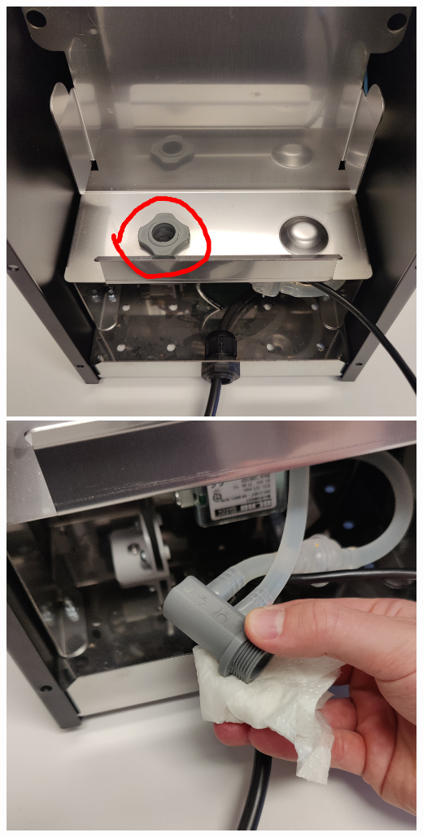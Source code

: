 \documentclass[]{article}
\begin{document}
\begin{minipage}[t]{0.4\linewidth}
	\includegraphics[width=\linewidth]{images/03_installation/08_remove_waterplug_screw.jpg}
	\includegraphics[width=\linewidth]{images/03_installation/09_drain_water.jpg}
\end{minipage}
\end{document}
